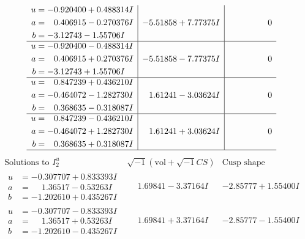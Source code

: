 \documentclass[1p]{elsarticle_modified}
\theoremstyle{definition}
\newcommand{\I}{\sqrt{-1}}
\begin{document}
$$\begin{array}{c|c|c}
\begin{aligned}
u &= -0.920400 + 0.488314 I \\
a &= \phantom{-}0.406915 - 0.270376 I \\
b &= -3.12743 - 1.55706 I\end{aligned}
 & -5.51858 + 7.77375 I & \phantom{-0.000000 } 0 \\ \hline\begin{aligned}
u &= -0.920400 - 0.488314 I \\
a &= \phantom{-}0.406915 + 0.270376 I \\
b &= -3.12743 + 1.55706 I\end{aligned}
 & -5.51858 - 7.77375 I & \phantom{-0.000000 } 0 \\ \hline\begin{aligned}
u &= \phantom{-}0.847239 + 0.436210 I \\
a &= -0.464072 - 1.282730 I \\
b &= \phantom{-}0.368635 - 0.318087 I\end{aligned}
 & \phantom{-}1.61241 - 3.03624 I & \phantom{-0.000000 } 0 \\ \hline\begin{aligned}
u &= \phantom{-}0.847239 - 0.436210 I \\
a &= -0.464072 + 1.282730 I \\
b &= \phantom{-}0.368635 + 0.318087 I\end{aligned}
 & \phantom{-}1.61241 + 3.03624 I & \phantom{-0.000000 } 0\\
 \hline 
 \end{array}$$\newpage$$\begin{array}{c|c|c}  
\text{Solutions to }I^u_{2}& \I (\text{vol} + \sqrt{-1}CS) & \text{Cusp shape}\\
 \hline 
\begin{aligned}
u &= -0.307707 + 0.833393 I \\
a &= \phantom{-}1.36517 - 0.53263 I \\
b &= -1.202610 + 0.435267 I\end{aligned}
 & \phantom{-}1.69841 - 3.37164 I & -2.85777 + 1.55400 I \\ \hline\begin{aligned}
u &= -0.307707 - 0.833393 I \\
a &= \phantom{-}1.36517 + 0.53263 I \\
b &= -1.202610 - 0.435267 I\end{aligned}
 & \phantom{-}1.69841 + 3.37164 I & -2.85777 - 1.55400 I \\ \hline\begin{aligned}

\end{aligned}
\end{array}$$
\end{document}
